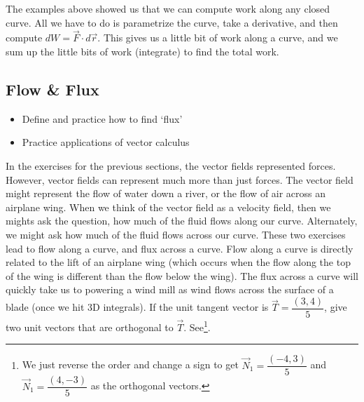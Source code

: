 \documentclass[10pt,]{book}
\theoremstyle{plain}
\theoremstyle{definition}
\theoremstyle{definition}
\theoremstyle{definition}
\theoremstyle{definition}
\theoremstyle{definition}
\numberwithin{equation}{section}
\begin{document}
The examples above showed us that we can compute work along any closed curve. All we have to do is parametrize the curve, take a derivative, and then compute \(dW = \vec F \cdot d\vec r\). This gives us a little bit of work along a curve, and we sum up the little bits of work (integrate) to find the total work.%
\typeout{************************************************}
\typeout{************************************************}
\subsection[{Flow \& Flux}]{Flow \& Flux}\label{subsection-29}
\leavevmode%
\begin{itemize}[label=\textbullet]
\item{}Define and practice how to find `flux'%
\item{}Practice applications of vector calculus%
\end{itemize}
In the exercises for the previous sections, the vector fields represented forces. However, vector fields can represent much more than just forces. The vector field might represent the flow of water down a river, or the flow of air across an airplane wing. When we think of the vector field as a velocity field, then we mights ask the question, how much of the fluid flows along our curve. Alternately, we might ask how much of the fluid flows across our curve. These two exercises lead to flow along a curve, and flux across a curve. Flow along a curve is directly related to the lift of an airplane wing (which occurs when the flow along the top of the wing is different than the flow below the wing). The flux across a curve will quickly take us to powering a wind mill as wind flows across the surface of a blade (once we hit 3D integrals).%
If the unit tangent vector is \(\vec T = \dfrac{(3,4)}{5}\), give two unit vectors that are orthogonal to \(\vec T\). See\footnote{We just reverse the order and change a sign to get \(\vec N_1 = \dfrac{(-4,3)}{5}\) and \(\vec N_1 = \dfrac{(4,-3)}{5}\) as the orthogonal vectors.\label{fn-19}}.%
\end{document}
